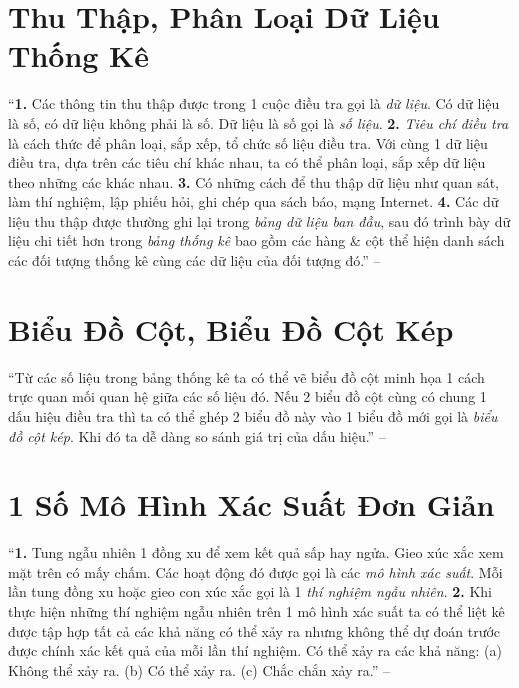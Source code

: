 \documentclass{article}
\numberwithin{equation}{section}
\begin{document}
\section{Thu Thập, Phân Loại Dữ Liệu Thống Kê}
``\textbf{1.} Các thông tin thu thập được trong 1 cuộc điều tra gọi là \textit{dữ liệu}. Có dữ liệu là số, có dữ liệu không phải là số. Dữ liệu là số gọi là \textit{số liệu}. \textbf{2.} \textit{Tiêu chí điều tra} là cách thức để phân loại, sắp xếp, tổ chức số liệu điều tra. Với cùng 1 dữ liệu điều tra, dựa trên các tiêu chí khác nhau, ta có thể phân loại, sắp xếp dữ liệu theo những các khác nhau. \textbf{3.} Có những cách để thu thập dữ liệu như quan sát, làm thí nghiệm, lập phiếu hỏi, ghi chép qua sách báo, mạng Internet. \textbf{4.} Các dữ liệu thu thập được thường ghi lại trong \textit{bảng dữ liệu ban đầu}, sau đó trình bày dữ liệu chi tiết hơn trong \textit{bảng thống kê} bao gồm các hàng \& cột thể hiện danh sách các đối tượng thống kê cùng các dữ liệu của đối tượng đó.'' --  \cite[Chap. I, \S1, p. 98]{Tuyen_Toan_6}


\section{Biểu Đồ Cột, Biểu Đồ Cột Kép}
``Từ các số liệu trong bảng thống kê ta có thể vẽ biểu đồ cột minh họa 1 cách trực quan mối quan hệ giữa các số liệu đó. Nếu 2 biểu đồ cột cùng có chung 1 dấu hiệu điều tra thì ta có thể ghép 2 biểu đồ này vào 1 biểu đồ mới gọi là \textit{biểu đồ cột kép}. Khi đó ta dễ dàng so sánh giá trị của dấu hiệu.'' --  \cite[Chap. I, \S2, p. 100]{Tuyen_Toan_6}


\section{1 Số Mô Hình Xác Suất Đơn Giản}
``\textbf{1.} Tung ngẫu nhiên 1 đồng xu để xem kết quả sấp hay ngửa. Gieo xúc xắc xem mặt trên có mấy chấm. Các hoạt động đó được gọi là các \textit{mô hình xác suất}. Mỗi lần tung đồng xu hoặc gieo con xúc xắc gọi là 1 \textit{thí nghiệm ngẫu nhiên}. \textbf{2.} Khi thực hiện những thí nghiệm ngẫu nhiên trên 1 mô hình xác suất ta có thể liệt kê được tập hợp tất cả các khả năng có thể xảy ra nhưng không thể dự đoán trước được chính xác kết quả của mỗi lần thí nghiệm. Có thể xảy ra các khả năng: (a) Không thể xảy ra. (b) Có thể xảy ra. (c) Chắc chắn xảy ra.'' --  \cite[Chap. II, \S1, p. 103]{Tuyen_Toan_6}
\end{document}

